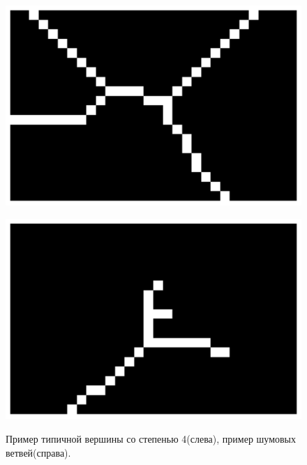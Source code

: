 \documentclass[10pt]{article}
\begin{document}
	\begin{figure}[h]
	\begin{minipage}[h]{0.4\linewidth}
		\begin{center}
			{\includegraphics[width=1.0\linewidth]{data/crop_1.pdf}}
		\end{center}
	\end{minipage}
	\hfill
	\begin{minipage}[h]{0.4\linewidth}
		\begin{center}
			{\includegraphics[width=1.0\linewidth]{data/crop_2.pdf}}
		\end{center}
	\end{minipage}
	
		\caption{Пример типичной вершины со степенью 4(слева), пример шумовых ветвей(справа).}
		\label{ris:image9}
	\end{figure}
	
\end{document}

